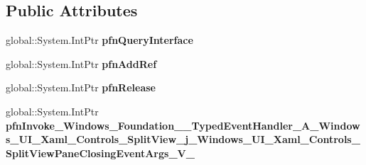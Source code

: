 \subsection*{Public Attributes}
\begin{DoxyCompactItemize}
\item 
\mbox{\label{struct_windows_1_1_foundation_1_1_typed_event_handler___a___windows___u_i___xaml___controls___spf724c7b43c58a64da16977f053e6f78f_af2bdfbed3180e307efd19ecc2d235a93}} 
global\+::\+System.\+Int\+Ptr {\bfseries pfn\+Query\+Interface}
\item 
\mbox{\label{struct_windows_1_1_foundation_1_1_typed_event_handler___a___windows___u_i___xaml___controls___spf724c7b43c58a64da16977f053e6f78f_a7587a111d95f5eafaa5624597fb645d0}} 
global\+::\+System.\+Int\+Ptr {\bfseries pfn\+Add\+Ref}
\item 
\mbox{\label{struct_windows_1_1_foundation_1_1_typed_event_handler___a___windows___u_i___xaml___controls___spf724c7b43c58a64da16977f053e6f78f_a13bb825d4032c2d81c5fdc469021d31f}} 
global\+::\+System.\+Int\+Ptr {\bfseries pfn\+Release}
\item 
\mbox{\label{struct_windows_1_1_foundation_1_1_typed_event_handler___a___windows___u_i___xaml___controls___spf724c7b43c58a64da16977f053e6f78f_af38a3a06d33c880dcbc220d5ffc4abc3}} 
global\+::\+System.\+Int\+Ptr {\bfseries pfn\+Invoke\+\_\+\+Windows\+\_\+\+Foundation\+\_\+\+\_\+\+Typed\+Event\+Handler\+\_\+\+A\+\_\+\+Windows\+\_\+\+U\+I\+\_\+\+Xaml\+\_\+\+Controls\+\_\+\+Split\+View\+\_\+j\+\_\+\+Windows\+\_\+\+U\+I\+\_\+\+Xaml\+\_\+\+Controls\+\_\+\+Split\+View\+Pane\+Closing\+Event\+Args\+\_\+\+V\+\_\+}
\end{DoxyCompactItemize}
